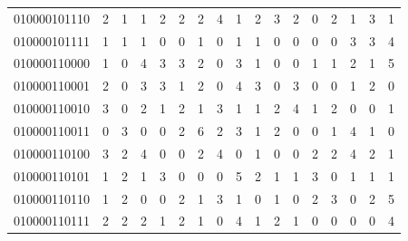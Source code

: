 \documentclass[10pt,a4paper]{article}
\begin{document}
\begin{longtable}{ |c|c|c|c|c|c|c|c|c|c|c|c|c|c|c|c|c| }
    010000101110              & 2                            & 1                                & 1                            & 2                              & 2   & 2   & 4   & 1   & 2   & 3   & 2   & 0   & 2   & 1   & 3   & 1   \\
    010000101111              & 1                            & 1                                & 1                            & 0                              & 0   & 1   & 0   & 1   & 1   & 0   & 0   & 0   & 0   & 3   & 3   & 4   \\
    010000110000              & 1                            & 0                                & 4                            & 3                              & 3   & 2   & 0   & 3   & 1   & 0   & 0   & 1   & 1   & 2   & 1   & 5   \\
    010000110001              & 2                            & 0                                & 3                            & 3                              & 1   & 2   & 0   & 4   & 3   & 0   & 3   & 0   & 0   & 1   & 2   & 0   \\
    010000110010              & 3                            & 0                                & 2                            & 1                              & 2   & 1   & 3   & 1   & 1   & 2   & 4   & 1   & 2   & 0   & 0   & 1   \\
    010000110011              & 0                            & 3                                & 0                            & 0                              & 2   & 6   & 2   & 3   & 1   & 2   & 0   & 0   & 1   & 4   & 1   & 0   \\
    010000110100              & 3                            & 2                                & 4                            & 0                              & 0   & 2   & 4   & 0   & 1   & 0   & 0   & 2   & 2   & 4   & 2   & 1   \\
    010000110101              & 1                            & 2                                & 1                            & 3                              & 0   & 0   & 0   & 5   & 2   & 1   & 1   & 3   & 0   & 1   & 1   & 1   \\
    010000110110              & 1                            & 2                                & 0                            & 0                              & 2   & 1   & 3   & 1   & 0   & 1   & 0   & 2   & 3   & 0   & 2   & 5   \\
    010000110111              & 2                            & 2                                & 2                            & 1                              & 2   & 1   & 0   & 4   & 1   & 2   & 1   & 0   & 0   & 0   & 0   & 4   \\

\end{longtable}
\end{document}
